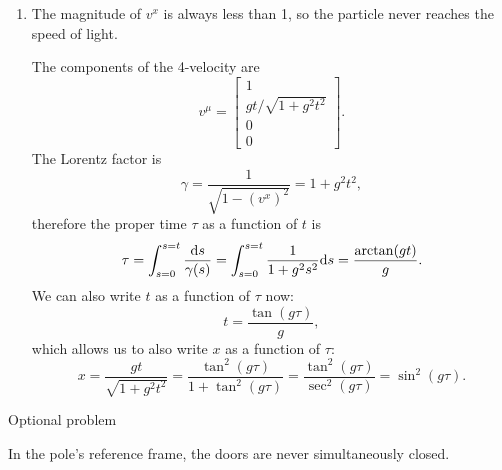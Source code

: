 \documentclass{article}
\begin{document}
\begin{enumerate}[label=(\alph*)]
    \item The magnitude of $v^x$ is always less than 1, so the particle never reaches the speed of light.
        \par
        The components of the 4-velocity are
        \[ v^\mu = \begin{bmatrix}
            1 \\
            gt/\sqrt{1+g^2t^2} \\
            0 \\
            0
        \end{bmatrix}. \]
        The Lorentz factor is
        \[ \gamma = \frac{1}{\sqrt{1-(v^x)^2}} = 1+g^2t^2, \]
        therefore the proper time $\tau$ as a function of $t$ is
        \[ \tau = \int_{s=0}^{s=t} \frac{\mathrm{d} s}{\gamma(s)} = \int_{s=0}^{s=t} \frac{1}{1+g^2 s^2} \mathrm{d} s = \frac{\arctan(g t)}{g}. \]
        We can also write $t$ as a function of $\tau$ now:
        \[ t = \frac{\tan (g \tau)}{g}, \]
        which allows us to also write $x$ as a function of $\tau$:
        \[ x = \frac{gt}{\sqrt{1+g^2t^2}} = \frac{\tan^2 (g \tau)}{1+\tan^2(g\tau)} = \frac{\tan^2(g\tau)}{\sec^2 (g \tau)} = \sin^2(g\tau).\]
        
\end{enumerate}

\bigskip
\par
\begin{prob}
    Optional problem
\end{prob}
In the pole's reference frame, the doors are never simultaneously closed.


\end{document}
